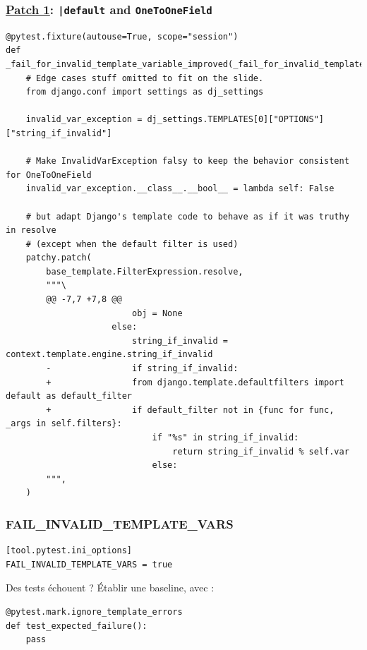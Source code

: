 \documentclass{beamer}
\begin{document}
\begin{frame}[fragile]
    \frametitle{\href{https://github.com/gip-inclusion/les-emplois/blob/c34a60b8dfd24418cbd22b6ad50101f377c1adb7/tests/conftest.py\#L289-L317}{Patch 1}: \texttt{|default} and \texttt{OneToOneField}}

    \begin{verbatim}
@pytest.fixture(autouse=True, scope="session")
def _fail_for_invalid_template_variable_improved(_fail_for_invalid_template_variable):
    # Edge cases stuff omitted to fit on the slide.
    from django.conf import settings as dj_settings

    invalid_var_exception = dj_settings.TEMPLATES[0]["OPTIONS"]["string_if_invalid"]

    # Make InvalidVarException falsy to keep the behavior consistent for OneToOneField
    invalid_var_exception.__class__.__bool__ = lambda self: False

    # but adapt Django's template code to behave as if it was truthy in resolve
    # (except when the default filter is used)
    patchy.patch(
        base_template.FilterExpression.resolve,
        """\
        @@ -7,7 +7,8 @@
                         obj = None
                     else:
                         string_if_invalid = context.template.engine.string_if_invalid
        -                if string_if_invalid:
        +                from django.template.defaultfilters import default as default_filter
        +                if default_filter not in {func for func, _args in self.filters}:
                             if "%s" in string_if_invalid:
                                 return string_if_invalid % self.var
                             else:
        """,
    )
    \end{verbatim}
\end{frame}

\begin{frame}[fragile]
    \frametitle{FAIL\_INVALID\_TEMPLATE\_VARS}
    \begin{verbatim}
[tool.pytest.ini_options]
FAIL_INVALID_TEMPLATE_VARS = true
    \end{verbatim}

    \pause

    Des tests échouent ? Établir une baseline, avec :

    \begin{verbatim}
@pytest.mark.ignore_template_errors
def test_expected_failure():
    pass
    \end{verbatim}
\end{frame}
\end{document}
